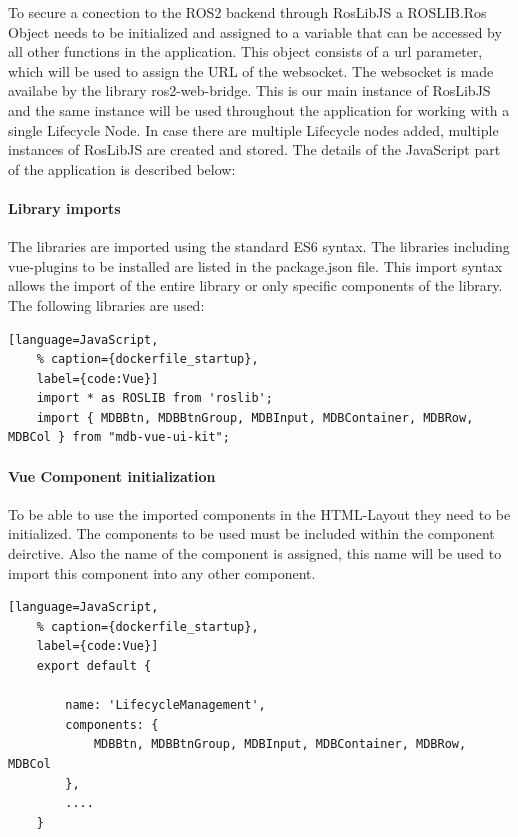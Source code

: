 To secure a conection to the ROS2 backend through RosLibJS a ROSLIB.Ros Object needs to be initialized and assigned to a variable that can be accessed by all other functions in the application. This object consists of a url parameter, which will be used to assign the URL of the websocket. The websocket is made availabe by the library ros2-web-bridge. This is our main instance of RosLibJS and the same instance will be used throughout the application for working with a single Lifecycle Node. In case there are multiple Lifecycle nodes added, multiple instances of RosLibJS are created and stored. The details of the JavaScript part of the application is described below:

\paragraph{Library imports} The libraries are imported using the standard ES6 syntax. The libraries including vue-plugins to be installed are listed in the package.json file. This import syntax allows the import of the entire library or only specific components of the library. The following libraries are used:

\begin{lstlisting}[language=JavaScript,
	% caption={dockerfile_startup}, 
	label={code:Vue}]
	import * as ROSLIB from 'roslib';
	import { MDBBtn, MDBBtnGroup, MDBInput, MDBContainer, MDBRow, MDBCol } from "mdb-vue-ui-kit";
\end{lstlisting}

\paragraph{Vue Component initialization} To be able to use the imported components in the HTML-Layout they need to be initialized. The components to be used must be included within the component deirctive. Also the name of the component is assigned, this name will be used to import this component into any other component. 
\begin{lstlisting}[language=JavaScript,
	% caption={dockerfile_startup}, 
	label={code:Vue}]
	export default {
	
		name: 'LifecycleManagement',
		components: {
			MDBBtn, MDBBtnGroup, MDBInput, MDBContainer, MDBRow, MDBCol
		},
		....
	}
\end{lstlisting}

